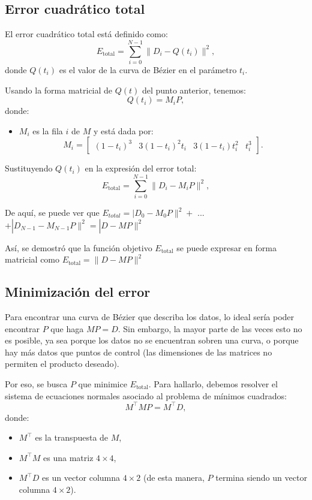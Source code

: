 \documentclass{article}
\begin{document}
\subsection*{Error cuadrático total}

El error cuadrático total está definido como:
\[
E_{\text{total}} = \sum_{i=0}^{N-1} \|D_i - Q(t_i)\|^2,
\]
donde \( Q(t_i) \) es el valor de la curva de Bézier en el parámetro \( t_i \).

Usando la forma matricial de \( Q(t) \) del punto anterior, tenemos:
\[
Q(t_i) = M_i P,
\]
donde:
\begin{itemize}
    \item \( M_i \) es la fila \( i \) de $M$ y está dada por:
    \[
    M_i = \begin{bmatrix}
    (1 - t_i)^3 & 3(1 - t_i)^2 t_i & 3(1 - t_i) t_i^2 & t_i^3
    \end{bmatrix}.
    \]
\end{itemize}

Sustituyendo \( Q(t_i) \) en la expresión del error total:
\[
    E_{\text{total}} = \sum_{i=0}^{N-1} \|D_i - M_iP\|^2,
\]

De aquí, se puede ver que $E_{total} = |D_0 - M_0P\|^2 +$ ... $+ |D_{N-1} - M_{N-1}P\|^2 = |D - MP\|^2$ 

Así, se demostró que la función objetivo \( E_{\text{total}}\) se puede expresar en forma matricial como  \( E_{\text{total}} = \|D - MP\|^2 \)

\subsection*{Minimización del error}
Para encontrar una curva de Bézier que describa los datos, lo ideal sería poder encontrar $P$ que haga $MP = D$. Sin embargo, la mayor parte de las veces esto no es posible, ya sea porque los datos no se encuentran sobren una curva, o porque hay más datos que puntos de control (las dimensiones de las matrices no permiten el producto deseado).

Por eso, se busca $P$ que minimice \( E_{\text{total}} \). Para hallarlo, debemos resolver el sistema de ecuaciones normales asociado al problema de mínimos cuadrados:
\[
M^\top M P = M^\top D,
\]
donde:
\begin{itemize}
    \item \( M^\top \) es la transpuesta de \( M \),
    \item \( M^\top M \) es una matriz \( 4 \times 4 \),
    \item \( M^\top D \) es un vector columna \( 4 \times 2 \) (de esta manera, $P$ termina siendo un vector columna $4 \times 2$).
\end{itemize}
\end{document}
